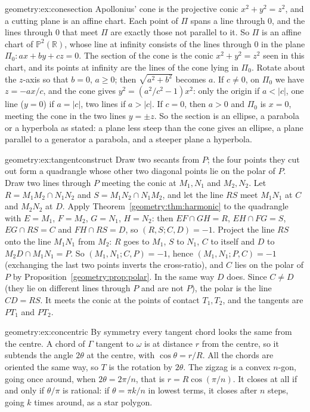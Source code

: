 \begin{solution}{geometry:ex:conesection}
\idea Apollonius' cone is the projective conic $x^2+y^2=z^2$, and a cutting plane is an affine chart.
\writeup Each point of $\Pi$ spans a line through $0$, and the lines through $0$ that meet $\Pi$ are exactly those not parallel to it. So $\Pi$ is an
affine chart of $\mathbb P^2(\mathbb R)$, whose line at infinity consists of the lines through $0$ in the plane $\Pi_0:ax+by+cz=0$. The section of the
cone is the conic $x^2+y^2=z^2$ seen in this chart, and its points at infinity are the lines of the cone lying in $\Pi_0$. Rotate about the $z$-axis so
that $b=0$, $a\ge0$; then $\sqrt{a^2+b^2}$ becomes $a$. If $c\ne0$, on $\Pi_0$ we have $z=-ax/c$, and the cone gives $y^2=(a^2/c^2-1)x^2$: only the
origin if $a<|c|$, one line ($y=0$) if $a=|c|$, two lines if $a>|c|$. If $c=0$, then $a>0$ and $\Pi_0$ is $x=0$, meeting the cone in the two lines $y=\pm z$.
So the section is an ellipse, a parabola or a hyperbola as stated: a plane less steep than the cone gives an ellipse, a plane parallel to a generator
a parabola, and a steeper plane a hyperbola.
\end{solution}

\begin{solution}{geometry:ex:tangentconstruct}
\idea Draw two secants from $P$; the four points they cut out form a quadrangle whose other two diagonal points lie on the polar of $P$.
\writeup Draw two lines through $P$ meeting the conic at $M_1,N_1$ and $M_2,N_2$. Let $R=M_1M_2\cap N_1N_2$ and $S=M_1N_2\cap N_1M_2$, and let the line $RS$ meet
$M_1N_1$ at $C$ and $M_2N_2$ at $D$. Apply Theorem~\ref{geometry:thm:harmonic} to the quadrangle with $E=M_1$, $F=M_2$, $G=N_1$, $H=N_2$: then $EF\cap GH=R$,
$EH\cap FG=S$, $EG\cap RS=C$ and $FH\cap RS=D$, so $(R,S;C,D)=-1$. Project the line $RS$ onto the line $M_1N_1$ from $M_2$: $R$ goes to $M_1$, $S$ to $N_1$,
$C$ to itself and $D$ to $M_2D\cap M_1N_1=P$. So $(M_1,N_1;C,P)=-1$, hence $(M_1,N_1;P,C)=-1$ (exchanging the last two points inverts the cross-ratio), and
$C$ lies on the polar of $P$ by Proposition~\ref{geometry:prop:polar}. In the same way $D$ does. Since $C\ne D$ (they lie on different lines through $P$ and are
not $P$), the polar is the line $CD=RS$. It meets the conic at the points of contact $T_1,T_2$, and the tangents are $PT_1$ and $PT_2$.
\end{solution}

\begin{solution}{geometry:ex:concentric}
\idea By symmetry every tangent chord looks the same from the centre.
\writeup A chord of $\Gamma$ tangent to $\omega$ is at distance $r$ from the centre, so it subtends the angle $2\theta$ at the centre, with $\cos\theta=r/R$.
All the chords are oriented the same way, so $T$ is the rotation by $2\theta$. The zigzag is a convex $n$-gon, going once around, when $2\theta=2\pi/n$,
that is $r=R\cos(\pi/n)$. It closes at all if and only if $\theta/\pi$ is rational: if $\theta=\pi k/n$ in lowest terms, it closes after $n$ steps,
going $k$ times around, as a star polygon.
\end{solution}

